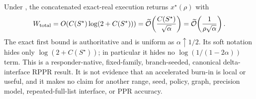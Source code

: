 \begin{corollary}[Exact local product-scale comparator at $k=1$]
\label{cor:branch-caterpillar-first-layer-product}
Under , the concatenated
exact-real execution returns $x^\star(\rho)$ with
\begin{equation}
 W_{\rm total}
 =O\!\left(C(S^\star)\log(2+C(S^\star))\right)
 =\widetilde{\mathcal{O}}\!\left(\frac{C(S^\star)}{\sqrt\alpha}\right)
 =\widetilde{\mathcal{O}}\!\left(\frac1{\rho\sqrt\alpha}\right).
 \label{eq:branch-caterpillar-first-layer-total-work}
\end{equation}
The exact first bound is authoritative and is uniform as
$\alpha\uparrow1/2$.  Its soft notation hides only
$\log(2+C(S^\star))$; in particular it hides no
$\log(1/(1-2\alpha))$ term.  This is a responder-native, fixed-family,
branch-seeded, canonical delta-interface RPPR result.  It is not evidence that
an accelerated burn-in is local or useful, and it makes no claim for another
range, seed, policy, graph, precision model, repeated-full-list interface, or
PPR accuracy.
\end{corollary}
